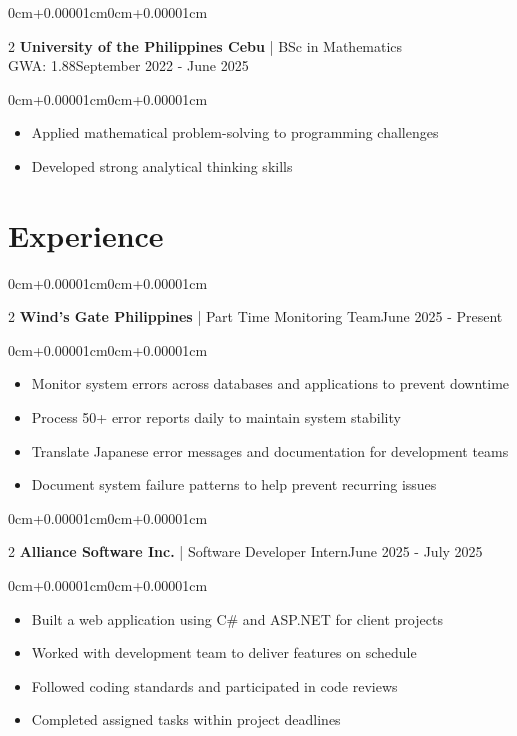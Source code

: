 \documentclass[10pt, letterpaper]{article}
\newenvironment{highlights}{\begin{itemize}[topsep=0.10cm,parsep=0.10cm,partopsep=0pt,itemsep=0pt,leftmargin=0cm+10pt]}{\end{itemize}}
\newenvironment{onecolentry}{\begin{adjustwidth}{0cm+0.00001cm}{0cm+0.00001cm}}{\end{adjustwidth}}
\newenvironment{twocolentry}[2][]{\onecolentry\def\secondColumn{#2}\setcolumnwidth{\fill,5cm}\begin{paracol}{2}}{\switchcolumn \raggedleft \secondColumn\end{paracol}\endonecolentry}
\begin{document}
    \begin{twocolentry}{September 2022 - June 2025}
        \textbf{University of the Philippines Cebu} | BSc in Mathematics\\
        GWA: 1.88\end{twocolentry}
    \vspace{0.10cm}
    \begin{onecolentry}
        \begin{highlights}
            \item Applied mathematical problem-solving to programming challenges
            \item Developed strong analytical thinking skills
        \end{highlights}
    \end{onecolentry}
    \vspace{0.15cm}

\section{Experience}

    \begin{twocolentry}{June 2025 - Present}
        \textbf{Wind's Gate Philippines} | Part Time Monitoring Team\end{twocolentry}
    \vspace{0.10cm}
    \begin{onecolentry}
        \begin{highlights}
            \item Monitor system errors across databases and applications to prevent downtime
            \item Process 50+ error reports daily to maintain system stability
            \item Translate Japanese error messages and documentation for development teams
            \item Document system failure patterns to help prevent recurring issues
        \end{highlights}
    \end{onecolentry}
    \vspace{0.15cm}

    \begin{twocolentry}{June 2025 - July 2025}
        \textbf{Alliance Software Inc.} | Software Developer Intern\end{twocolentry}
    \vspace{0.10cm}
    \begin{onecolentry}
        \begin{highlights}
            \item Built a web application using C\# and ASP.NET for client projects
            \item Worked with development team to deliver features on schedule
            \item Followed coding standards and participated in code reviews
            \item Completed assigned tasks within project deadlines
        \end{highlights}
    \end{onecolentry}
    \vspace{0.15cm}
\end{document}
